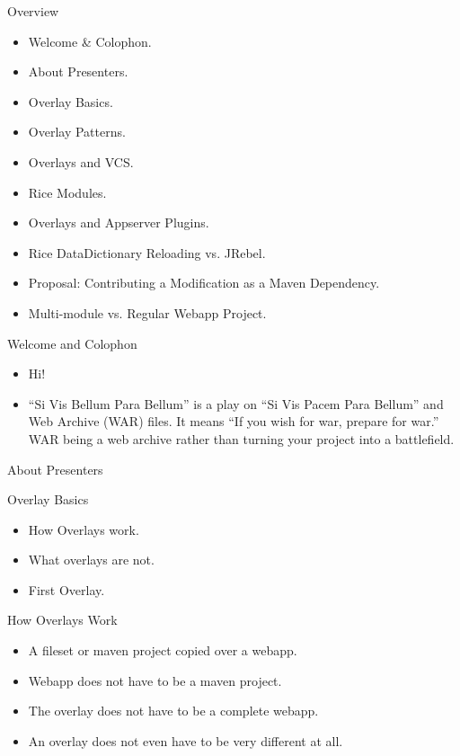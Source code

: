 \documentclass[xcolor=dvipsnames,14pt,professionalfonts]{beamer}
\begin{document}
\begin{frame}{Overview}
  \begin{itemize}
  \item Welcome \& Colophon.
  \item About Presenters.
  \item Overlay Basics.
  \item Overlay Patterns.
  \item Overlays and VCS.
  \item Rice Modules.
  \item Overlays and Appserver Plugins.
  \item Rice DataDictionary Reloading vs. JRebel.
  \item Proposal: Contributing a Modification as a Maven Dependency.
  \item Multi-module vs. Regular Webapp Project.
  \end{itemize}
\end{frame}

\begin{frame}{Welcome and Colophon}
  \begin{itemize}
    \item Hi!
    \item ``Si Vis Bellum Para Bellum'' is a play on ``Si Vis Pacem
      Para Bellum'' and Web Archive (WAR) files. It means ``If you
      wish for war, prepare for war.'' WAR being a web archive rather than turning your project into a battlefield.
  \end{itemize}
\end{frame}

\begin{frame}{About Presenters}
\end{frame}

\begin{frame}{Overlay Basics}
  \begin{itemize}
  \item How Overlays work.
  \item What overlays are not.
  \item First Overlay.
  \end{itemize}
\end{frame}

\begin{frame}{How Overlays Work}
  \begin{itemize}
    \item A fileset or maven project copied over a webapp.
    \item Webapp does not have to be a maven project.
    \item The overlay does not have to be a complete webapp.
    \item An overlay does not even have to be very different at all.
  \end{itemize}
\end{frame}
\end{document}
